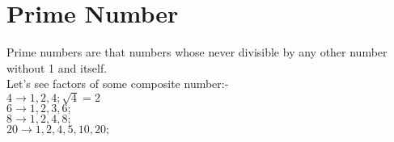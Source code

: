 \documentclass[11 pt]{article}
\author{Sofiullah Iqbal Kiron}
\date{30-Mar, 20}
\begin{document}
 \section*{Prime Number}
 Prime numbers are that numbers whose never divisible by any other number without 1 and itself.\\
 Let's see factors of some composite number:-\\
 $4 \rightarrow 1, 2, 4;\sqrt{4}=2$\\
 $6 \rightarrow 1, 2, 3, 6;$\\
 $8 \rightarrow 1, 2, 4, 8;$\\
 $20 \rightarrow 1, 2, 4, 5, 10, 20;$
\end{document}
